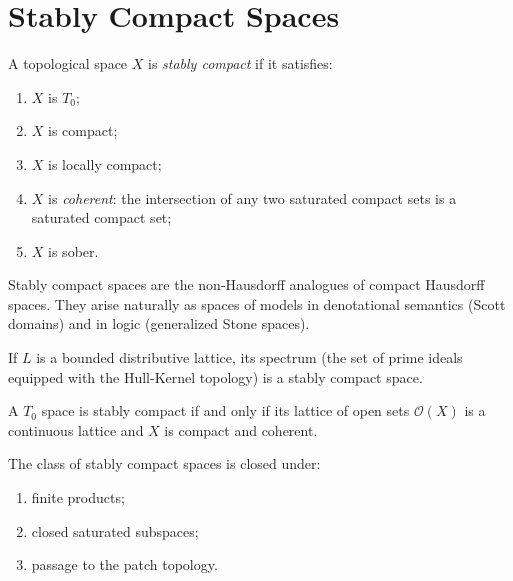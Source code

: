 \section{Stably Compact Spaces}

\begin{definition}
A topological space $X$ is \emph{stably compact} if it satisfies:
\begin{enumerate}
  \item $X$ is $T_0$;
  \item $X$ is compact;
  \item $X$ is locally compact;
  \item $X$ is \emph{coherent}: the intersection of any two saturated compact sets is a
    saturated compact set;
  \item $X$ is sober.
\end{enumerate}
\end{definition}

\begin{intuition}
Stably compact spaces are the non-Hausdorff analogues of compact Hausdorff spaces. They
arise naturally as spaces of models in denotational semantics (Scott domains) and in logic
(generalized Stone spaces).
\end{intuition}

\begin{example}
If $L$ is a bounded distributive lattice, its spectrum (the set of prime ideals equipped
with the Hull-Kernel topology) is a stably compact space.
\end{example}

\begin{theorem}
A $T_0$ space is stably compact if and only if its lattice of open sets $\mathcal{O}(X)$
is a continuous lattice and $X$ is compact and coherent.
\end{theorem}

\begin{proposition}
The class of stably compact spaces is closed under:
\begin{enumerate}
  \item finite products;
  \item closed saturated subspaces;
  \item passage to the patch topology.
\end{enumerate}
\end{proposition}

